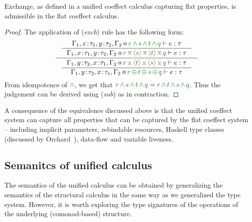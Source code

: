 \begin{lemma}
\label{thm:unified-rev-exch}
Exchange, as defined in a unified coeffect calculus capturing flat properties, is admissible in 
the flat coeffect calculus.
\end{lemma}
\begin{proof}
The application of (\emph{exch}) rule has the following form:
\begin{equation*}
\inference
 {\inference
    {\coctx{\Gamma_1,x\!:\!\tau_1,y\!:\!\tau_2,\Gamma_2}{\cclrd{r} \,\czip\, \cclrd{s} \,\czip\, \cclrd{t} \,\czip\, \cclrd{q}} \vdash e : \tau}
    {\coctx{\Gamma_1,x\!:\!\tau_1,y\!:\!\tau_2,\Gamma_2}{\cclrd{r} \,\azip\, \alift{\cclrd{s}} \,\azip\, \alift{\cclrd{t}} \,\azip\, \cclrd{q}} \vdash e : \tau} }
 {\inference
    {\coctx{\Gamma_1,y\!:\!\tau_2,x\!:\!\tau_1,\Gamma_2}{\cclrd{r} \,\apar\, \alift{\cclrd{t}} \,\apar\, \alift{\cclrd{s}} \,\apar\, \cclrd{q}} \vdash e : \tau}
    {\coctx{\Gamma_1,y\!:\!\tau_2,x\!:\!\tau_1,\Gamma_2}{\cclrd{r} \,\cpar\, \cclrd{t} \,\cpar\, \cclrd{s} \,\cpar\, \cclrd{q}} \vdash e : \tau} }
\end{equation*}
%
From idempotence of $\czip$, we get that $\cclrd{r} \,\czip\, \cclrd{s} \,\czip\, \cclrd{t} \,\czip\, \cclrd{q} =
\cclrd{r} \,\czip\, \cclrd{t} \,\czip\, \cclrd{s} \,\czip\, \cclrd{q}$. Thus the judgement can be derived using
(\emph{sub}) as in contraction.
\end{proof}

\noindent
A consequence of the equivalence discussed above is that the unified coeffect system can capture 
all properties that can be captured by the flat coeffect system -- including implicit parameters,
rebindable resources, Haskell type classes (discussed by Orchard~\cite{comonads-dom-thesis}),
data-flow and variable liveness.


\subsection{Semanitcs of unified calculus}
\label{sec:unified-semantics}

The semantics of the unified calculus can be obtained by generalizing the semantics of the structural
calculus in the same way as we generalized the type system. However, it is worth exploring the type 
signatures of the operations of the underlying (comonad-based) structure.

